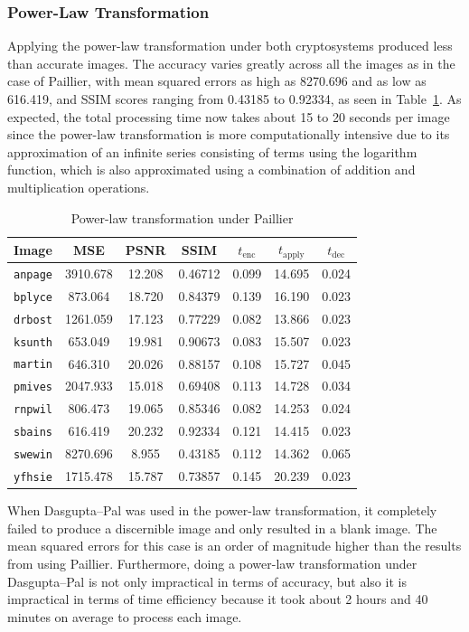 \subsubsection{Power-Law Transformation}
Applying the power-law transformation under both cryptosystems produced less than accurate images. The accuracy varies greatly across all the images as in the case of Paillier, with mean squared errors as high as 8270.696 and as low as 616.419, and SSIM scores ranging from 0.43185 to 0.92334, as seen in Table~\ref{tbl:pwr-pal}. As expected, the total processing time now takes about 15 to 20 seconds per image since the power-law transformation is more computationally intensive due to its approximation of an infinite series consisting of terms using the logarithm function, which is also approximated using a combination of addition and multiplication operations.

\begin{table}[h]
	\caption{Power-law transformation under Paillier}
	\label{tbl:pwr-pal}
    \begin{tabular}{lcccccc}
        \toprule
        Image & MSE  & PSNR & SSIM & $t_\text{enc}$ & $t_\text{apply}$ & $t_\text{dec}$ \\ \midrule
        \texttt{anpage} & 3910.678 & 12.208 & 0.46712 & 0.099 & 14.695 & 0.024 \\
		\texttt{bplyce} & 873.064 & 18.720 & 0.84379 & 0.139 & 16.190 & 0.023 \\
		\texttt{drbost} & 1261.059 & 17.123 & 0.77229 & 0.082 & 13.866 & 0.023 \\
		\texttt{ksunth} & 653.049 & 19.981 & 0.90673 & 0.083 & 15.507 & 0.023 \\
		\texttt{martin} & 646.310 & 20.026 & 0.88157 & 0.108 & 15.727 & 0.045 \\
		\texttt{pmives} & 2047.933 & 15.018 & 0.69408 & 0.113 & 14.728 & 0.034 \\
		\texttt{rnpwil} & 806.473 & 19.065 & 0.85346 & 0.082 & 14.253 & 0.024 \\
		\texttt{sbains} & 616.419 & 20.232 & 0.92334 & 0.121 & 14.415 & 0.023 \\
		\texttt{swewin} & 8270.696 & 8.955 & 0.43185 & 0.112 & 14.362 & 0.065 \\
		\texttt{yfhsie} & 1715.478 & 15.787 & 0.73857 & 0.145 & 20.239 & 0.023 \\
		\bottomrule
        \end{tabular}
\end{table}

When Dasgupta--Pal was used in the power-law transformation, it completely failed to produce a discernible image and only resulted in a blank image. The mean squared errors for this case is an order of magnitude higher than the results from using Paillier. Furthermore, doing a power-law transformation under Dasgupta--Pal is not only impractical in terms of accuracy, but also it is impractical in terms of time efficiency because it took about 2 hours and 40 minutes on average to process each image.

